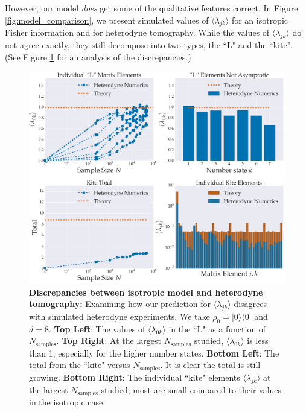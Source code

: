 \documentclass[aps,pra, twocolumn]{revtex4-1}
\begin{document}
However, our model \emph{does} get some of the qualitative features correct. In Figure \ref{fig:model_comparison}, we present simulated values of $\langle \lambda_{jk}\rangle$ for an isotropic Fisher information and for heterodyne tomography. While the values of $\langle \lambda_{jk} \rangle$ do not agree exactly, they still decompose into two types, the ``L" and the ``kite". (See Figure \ref{fig:individcontrib} for an analysis of the discrepancies.)
 
 


\begin{figure}
  \includegraphics[width=\columnwidth]{Images/Figure_14.pdf}
 \caption{\textbf{Discrepancies between isotropic model and heterodyne tomography:} Examining how our prediction for $\langle \lambda_{jk} \rangle$ disagrees with simulated heterodyne experiments. We take $\rho_{0} = |0\rangle\langle 0|$ and $d=8$. \textbf{Top Left}: The values of  $\langle \lambda_{0k}\rangle$ in the ``L" as a function of $N_{\mathrm{samples}}$.  \textbf{Top Right}:  At the largest $N_{\mathrm{samples}}$ studied, $\langle \lambda_{0k}\rangle$ is less than 1, especially for the higher number states. \textbf{Bottom Left}: The total from the ``kite" versus $N_{\mathrm{samples}}$. It is clear the total is still growing. \textbf{Bottom Right}: The individual ``kite" elements $\langle \lambda_{jk}\rangle$ at the largest $N_{\mathrm{samples}}$ studied;  most are small compared to their values in the isotropic case.}
\label{fig:individcontrib}
\end{figure}
\end{document}
